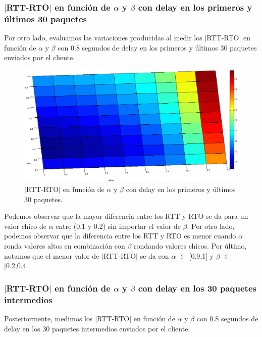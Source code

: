 \documentclass[10pt, a4paper]{article}
\begin{document}
\subsubsection{$|$RTT-RTO$|$ en función de $\alpha$ y $\beta$ con delay en los primeros y últimos 30 paquetes}
Por otro lado, evaluamos las variaciones producidas al medir los $|$RTT-RTO$|$ en función de $\alpha$ y $\beta$ con 0.8 segundos de delay en los primeros y últimos 30 paquetes enviados por el cliente.

\begin{figure}[H]
\begin{center}
\includegraphics[width=17cm]{delay-30F30L-costado.png}
\caption{$|$RTT-RTO$|$ en función de $\alpha$ y $\beta$ con delay en los primeros y últimos 30 paquetes.}
\end{center}
\end{figure}

Podemos observar que la mayor diferencia entre los RTT y RTO se da para un valor chico de $\alpha$ entre (0.1 y 0.2) sin importar el valor de $\beta$.
Por otro lado, podemos observar que la diferencia entre los RTT y RTO es menor cuando $\alpha$ ronda valores altos en combinación con $\beta$ rondando valores chicos.
Por último, notamos que el menor valor de $|$RTT-RTO$|$ se da con $\alpha$ $\in$ [0.9,1] y $\beta$ $\in$ [0.2,0.4].


\subsubsection{$|$RTT-RTO$|$ en función de $\alpha$ y $\beta$ con delay en los 30 paquetes intermedios}
Posteriormente, medimos los $|$RTT-RTO$|$ en función de $\alpha$ y $\beta$ con 0.8 segundos de delay en los 30 paquetes intermedios enviados por el cliente.
\end{document}
